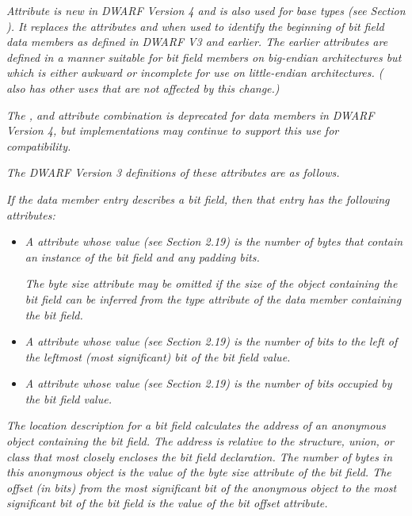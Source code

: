 \textit{Attribute  is new in DWARF Version 4 and
is also used for base types 
(see Section ). 
It replaces the
attributes  and  when used to
identify the beginning of bit field data members as defined
in DWARF V3 and earlier. The earlier attributes are defined
in a manner suitable for bit field members on big-endian
architectures but which is either awkward or incomplete for
use on little-endian architectures.  ( also
has other uses that are not affected by this change.)}

\textit{The ,  and 
attribute combination is deprecated for data members in DWARF
Version 4, but implementations may continue to support this
use for compatibility.}

\textit{The DWARF Version 3 definitions of these attributes are
as follows.}

\begin{myindentpara}{1cm}
\textit{If the data member entry describes a bit field, then that
entry has the following attributes:}

\begin{itemize}
\item \textit{A  attribute whose value (see Section
2.19) is the number of bytes that contain an instance of the
bit field and any padding bits.}

\textit{The byte size attribute may be omitted if the size of the
object containing the bit field can be inferred from the type
attribute of the data member containing the bit field.}

\item \textit{A  attribute whose value (see Section
2.19) is the number of bits to the left of the leftmost
(most significant) bit of the bit field value.}

\item \textit{A  attribute whose value (see Section
2.19) is the number of bits occupied by the bit field value.}

\end{itemize}

\textit{The location description for a bit field calculates the address
of an anonymous object containing the bit field. The address
is relative to the structure, union, or class that most closely
encloses the bit field declaration. The number of bytes in this
anonymous object is the value of the byte size attribute of
the bit field. The offset (in bits) from the most significant
bit of the anonymous object to the most significant bit of
the bit field is the value of the bit offset attribute.}
\end{myindentpara}


